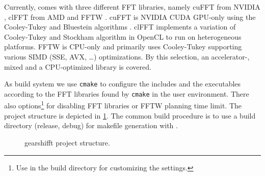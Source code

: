 Currently, \gearshifft{} comes with three different FFT libraries, namely cuFFT from NVIDIA \cite{cufft}, clFFT from AMD \cite{clfft} and FFTW \cite{FFTW97, FFTW05}.
cuFFT is NVIDIA CUDA GPU-only using the Cooley-Tukey and Bluestein algorithms \cite{cooley65,bluestein}.
clFFT implements a variation of Cooley-Tukey and Stockham algorithm in OpenCL to run on heterogeneous platforms.
FFTW is CPU-only and primarily uses Cooley-Tukey supporting various SIMD (SSE, AVX, \ldots) optimizations.
By this selection, an accelerator-, mixed and a CPU-optimized library is covered.

As build system we use \texttt{cmake} to configure the includes and the executables according to the FFT libraries found by \texttt{cmake} in the user environment. There also options\footnote{Use  in the build directory for customizing the settings.} for disabling FFT libraries or FFTW planning time limit. The project structure is depicted in \cref{fig:projstruct}. The common build procedure is to use a build directory (release, debug) for makefile generation with .

\begin{figure}[htp]
 \caption{gearshifft project structure.}
 \label{fig:projstruct}
\end{figure}




